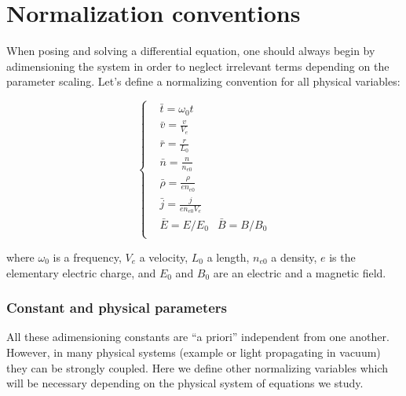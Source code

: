 \chapter{Normalization conventions}
\label{ch:Normalisation conventions}


\noindent When posing and solving a differential equation, one should always begin by adimensioning the system in order to neglect irrelevant terms depending on the parameter scaling. 
Let's define a normalizing convention for all physical variables:

\begin{equation}
\label{eq:NormalizedVariables}
  \left\{
      \begin{aligned}
     &\bar{t} = \omega_0 t\\
     &\bar{v} =  \frac{v}{V_e} \\
     & \bar{r} = \frac{r}{L_0}\\  
     & \bar{n} = \frac{n}{n_{e0}}\\
     &\bar{\rho} = \frac{\rho}{en_{e0}}\\
     & \bar{j} = \frac{j}{en_{e0}V_e} \\
     & \bar{E} = E/E_0
     & \bar{B} = B/B_0 \\
      \end{aligned}
    \right.
\end{equation}

\noindent where $\omega_0$ is a frequency, $V_e$ a velocity, $L_0$ a length, $n_{e0}$ a density, $e$ is the elementary electric charge, and $E_0$ and $B_0$ are an electric and a magnetic field.

\subsection{Constant and physical parameters}

\noindent All these adimensioning constants are ``a priori'' independent from one another. However, in many physical systems (example or light propagating in vacuum) they can be strongly coupled. Here we define other normalizing variables which will be necessary depending on the physical system of equations we study.
\newpage

